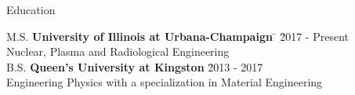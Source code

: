 \documentclass{resume2} %
\begin{document}

\begin{rSection}{Education}
	
\begin{tabbing}
M.S. \hspace*{2 em}\= \textbf{University of Illinois at Urbana-Champaign} \hspace*{5em} \= \hspace*{6em} \= 2017 - Present \\
\> Nuclear, Plasma and Radiological Engineering \\
%
B.S. \hspace*{2 em}\> \textbf{Queen's University at Kingston} \> \hspace*{7.2em} \= 2013 - 2017 \\
\> Engineering Physics with a specialization in Material Engineering
\end{tabbing}

\end{rSection}

\end{document}
